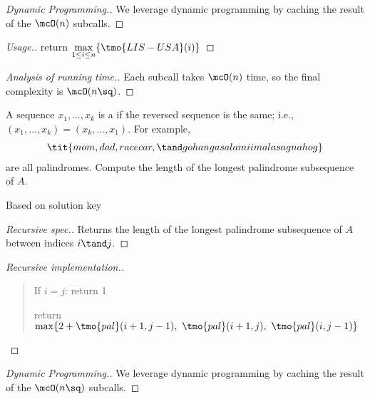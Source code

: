 \documentclass{article}
\begin{document}
\begin{proof}[Dynamic Programming.]
  We leverage dynamic programming by caching the result of the \( \mcO(n) \) subcalls.
\end{proof}

\begin{proof}[Usage.]
  return \( \max\limits_{1\leq i\leq n}\{\tmo{LIS-USA}(i)\} \)
\end{proof}

\begin{proof}[Analysis of running time.]
  Each subcall takes \( \mcO(n) \) time, so the final complexity is \( \mcO(n\sq) \).
\end{proof}
\pagebreak

\begin{subexercise}
A sequence \( x_1,\ldots, x_k \) is a  if the reversed sequence is the same; i.e., \( (x_1,\ldots,x_k) = (x_k,\ldots,x_1) \). For example, \begin{align*}
  \tit{mom, dad, racecar,\tand gohangasalamiimalasagnahog}
\end{align*}
are all palindromes. Compute the length of the longest palindrome subsequence of \( A \).
\end{subexercise}

\begin{note}
  Based on solution key
\end{note}

\begin{proof}[Recursive spec.]
  Returns the length of the longest palindrome subsequence of \( A \) between indices \( i \tand j \).
\end{proof}

\begin{proof}[Recursive implementation.]\
\begin{quote}
\begin{steps}
  \item If \( i = j \): return 1
  \item return \( \max\{ 2+\tmo{pal}(i+1,j-1),\ \tmo{pal}(i+1,j),\ \tmo{pal}(i,j-1) \} \)
\end{steps}
\end{quote}
\end{proof}

\begin{proof}[Dynamic Programming.]
  We leverage dynamic programming by caching the result of the \( \mcO(n\sq) \) subcalls.
\end{proof}
\end{document}
